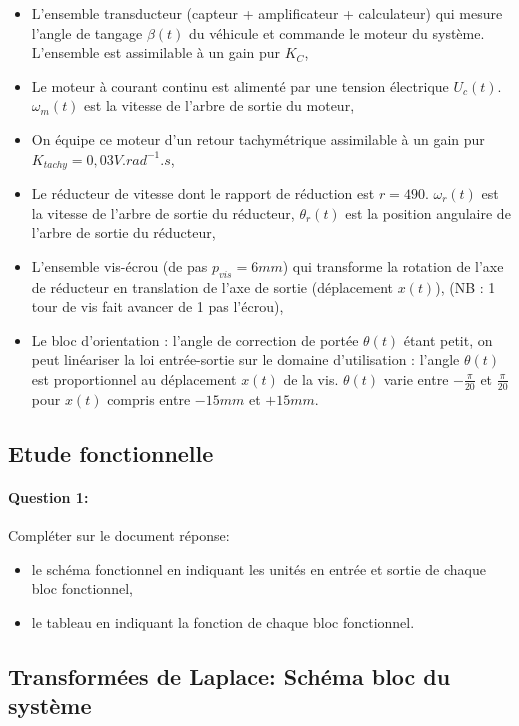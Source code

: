 \begin{itemize}
 \item L'ensemble transducteur (capteur + amplificateur + calculateur) qui mesure l'angle de tangage $\beta(t)$ du véhicule et commande le moteur du système. L'ensemble est assimilable à un gain pur $K_C$,
 \item Le moteur à courant continu est alimenté par une tension électrique $U_c(t)$.
$\omega_m(t)$ est la vitesse de l'arbre de sortie du moteur,
 \item On équipe ce moteur d'un retour tachymétrique assimilable à un gain pur $K_{tachy}=0,03 V.rad^{-1}.s$,
 \item Le réducteur de vitesse dont le rapport de réduction est $r=490$. $\omega_r(t)$ est la vitesse de l'arbre de sortie du réducteur, $\theta_r(t)$ est la position angulaire de l'arbre de sortie du réducteur,
 \item L'ensemble vis-écrou (de pas $p_{vis}=6mm$) qui transforme la rotation de l'axe de réducteur en translation de l'axe de sortie (déplacement $x(t)$), (NB : 1 tour de vis fait avancer de 1 pas l'écrou),
 \item Le bloc d'orientation : l'angle de correction de portée $\theta(t)$ étant petit, on peut linéariser la loi entrée-sortie sur le domaine d'utilisation : l'angle $\theta(t)$ est proportionnel au déplacement $x(t)$ de la vis. $\theta(t)$ varie entre $-\frac{\pi}{20}$ et $\frac{\pi}{20}$ pour $x(t)$ compris entre $-15mm$ et $+15mm$.
\end{itemize}

\subsection{Etude fonctionnelle}

\paragraph{Question 1:} Compléter sur le document réponse:
\begin{itemize}
 \item le schéma fonctionnel en indiquant les unités en entrée et sortie de chaque bloc fonctionnel,
 \item le tableau en indiquant la fonction de chaque bloc fonctionnel.
\end{itemize}

\subsection{Transformées de Laplace: Schéma bloc du système}

